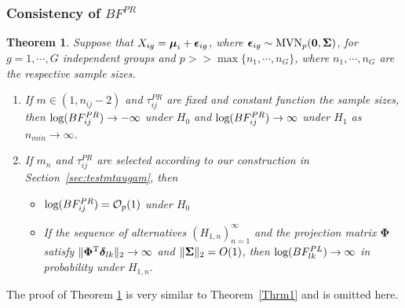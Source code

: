 \documentclass[times,sort&compress,3p]{elsarticle}
\theoremstyle{plain}%
\newtheorem{theorem}{Theorem}
\theoremstyle{definition}
\def\bzero{{\mathbf 0}}
\def\log{\hbox{log}}
\def\MVN{\hbox{MVN}}
\def\log{\hbox{log}}
\def\trans{^{\rm T}}
\def\bzero{{\mathbf 0}}
\newcommand{\bSigma}{\mbox{\boldmath $\Sigma$}}
\newcommand{\udelta}            {\mbox{\boldmath$\delta$}}
\newcommand{\uepsilon}          {\mbox{\boldmath$\epsilon$}}
\newcommand{\umu}               {\mbox{\boldmath$\mu$}}
\newcommand{\uSigma}            {\mbox{\boldmath$\Sigma$}}
\begin{document}
\subsubsection{Consistency of $BF_{}^{PR}$}
{\color{red}
\begin{theorem}\label{Thrm2}
Suppose that $X_{ig} = \umu_i + \uepsilon_{ig}$, where $\uepsilon_{ig} \sim \MVN_{p}(\bzero, \uSigma)$, for $g = 1, \cdots, G$ independent groups and $p >> \max\{n_1, \cdots, n_{G}\}$, where $n_1, \cdots, n_{G}$ are the respective sample sizes. %
\begin{enumerate}
    \item If $m \in (1,  n_{ij} - 2)$ and $\tau^{PR}_{ij}$ are fixed and constant function the sample sizes, 
    then $\log(BF^{PR}_{ij}) \rightarrow -\infty$ under $H_0$ and $\log(BF^{PR}_{ij}) \rightarrow \infty$ under $H_1$ as $n_{min} \rightarrow \infty$. 
    \item If $m_n$ and $\tau^{PR}_{ij}$ are selected according to our construction in Section~\ref{sec:testmtaugam}, then 
    \begin{itemize}
     \item[(a)]  $\log(BF^{PR}_{ij}) = \mathcal{O}_{p}(1)$ under $H_0$ 
     \item[(b)] 
     If the sequence of alternatives $(H_{1,n})_{n = 1}^\infty$ and the projection matrix $\mathbf{\Phi}$ satisfy $\|\mathbf{\Phi}\trans\udelta_{lk}\|_2\to\infty$ and $\|\bSigma\|_2 = O(1)$, then $\log(BF^{PL}_{lk}) \rightarrow \infty$ in probability under $H_{1,n}$. 
    \end{itemize}
\end{enumerate}
\end{theorem}
The proof of Theorem \ref{Thrm2} is very similar to Theorem~\ref{Thrm1} and is omitted here. 
 }
\end{document}
